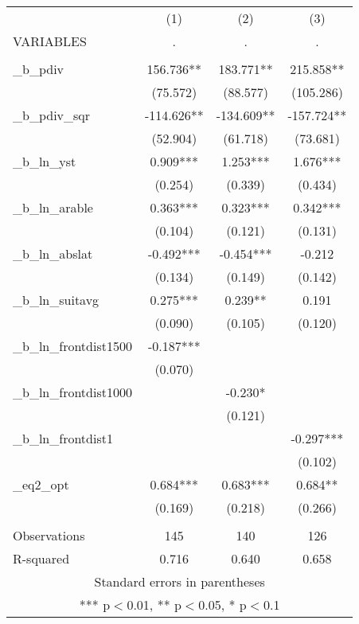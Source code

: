\documentclass[]{article}
\begin{document}
\begin{tabular}{lccc} \hline
 & (1) & (2) & (3) \\
VARIABLES & . & . & . \\ \hline
 &  &  &  \\
\_b\_pdiv & 156.736** & 183.771** & 215.858** \\
 & (75.572) & (88.577) & (105.286) \\
\_b\_pdiv\_sqr & -114.626** & -134.609** & -157.724** \\
 & (52.904) & (61.718) & (73.681) \\
\_b\_ln\_yst & 0.909*** & 1.253*** & 1.676*** \\
 & (0.254) & (0.339) & (0.434) \\
\_b\_ln\_arable & 0.363*** & 0.323*** & 0.342*** \\
 & (0.104) & (0.121) & (0.131) \\
\_b\_ln\_abslat & -0.492*** & -0.454*** & -0.212 \\
 & (0.134) & (0.149) & (0.142) \\
\_b\_ln\_suitavg & 0.275*** & 0.239** & 0.191 \\
 & (0.090) & (0.105) & (0.120) \\
\_b\_ln\_frontdist1500 & -0.187*** &  &  \\
 & (0.070) &  &  \\
\_b\_ln\_frontdist1000 &  & -0.230* &  \\
 &  & (0.121) &  \\
\_b\_ln\_frontdist1 &  &  & -0.297*** \\
 &  &  & (0.102) \\
\_eq2\_opt & 0.684*** & 0.683*** & 0.684** \\
 & (0.169) & (0.218) & (0.266) \\
 &  &  &  \\
Observations & 145 & 140 & 126 \\
 R-squared & 0.716 & 0.640 & 0.658 \\ \hline
\multicolumn{4}{c}{ Standard errors in parentheses} \\
\multicolumn{4}{c}{ *** p$<$0.01, ** p$<$0.05, * p$<$0.1} \\
\end{tabular}
\end{document}

